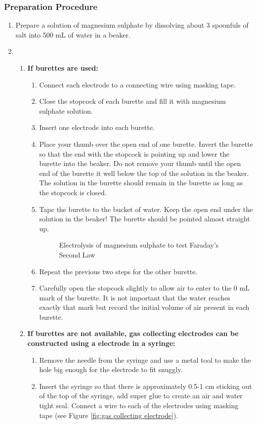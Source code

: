 \subsubsection*{Preparation Procedure}
\begin{enumerate}
\item{Prepare a solution of magnesium sulphate by dissolving about 3 spoonfuls of salt into 500 mL of water in a beaker.}
\item{}
\begin{enumerate}
\item{\textbf{If burettes are used:}}
\begin{enumerate}
\item{Connect each electrode to a connecting wire using masking tape.}
\item{Close the stopcock of each burette and fill it with magnesium sulphate solution.} 
\item{Insert one electrode into each burette.}
\item{Place your thumb over the open end of one burette. Invert the burette so that the end with the stopcock is pointing up and lower the burette into the beaker. Do not remove your thumb until the open end of the burette it well below the top of the solution in the beaker. The solution in the burette should remain in the burette as long as the stopcock is closed.}
\item{Tape the burette to the bucket of water. Keep the open end under the solution in the beaker! The burette should be pointed almost straight up.}
\begin{figure}[h!]
\begin{center}
\def\svgwidth{150pt}

\caption{Electrolysis of magnesium sulphate to test Faraday's Second Law}
\label{faraday-1}
\end{center}
\end{figure}
\item{Repeat the previous two steps for the other burette.}
\item{Carefully open the stopcock slightly to allow air to enter to the 0 mL mark of the burette. It is not important that the water reaches exactly that mark but record the initial volume of air present in each burette.}
\end{enumerate}
\item{\textbf{If burettes are not available, gas collecting electrodes can be constructed using a electrode in a syringe:}}
\begin{enumerate}
\item{Remove the needle from the syringe and use a metal tool to make the hole big enough for the electrode to fit snuggly.}
\item{Insert the syringe so that there is approximately 0.5-1 cm sticking out of the top of the syringe, add super glue to create an air and water tight seal. Connect a wire to each of the electrodes using masking tape (see Figure \ref{fig:gas collecting electrode}).

}
\end{enumerate}
\end{enumerate}
\end{enumerate}

